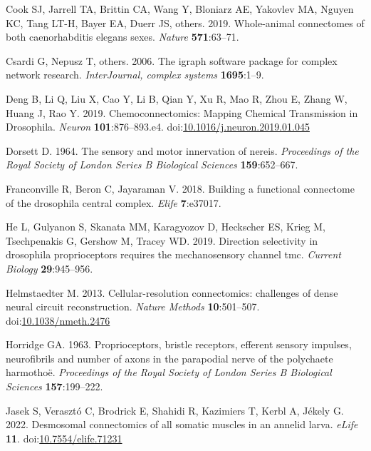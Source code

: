 \documentclass[
  11pt,
]{article}
\newlength{\cslhangindent}
\newenvironment{CSLReferences}[2] %
 {\begin{list}{}{%
  \setlength{\itemindent}{0pt}
  \setlength{\leftmargin}{0pt}
  \setlength{\parsep}{0pt}
  \ifodd #1
   \setlength{\leftmargin}{\cslhangindent}
   \setlength{\itemindent}{-1\cslhangindent}
  \fi
  \setlength{\itemsep}{#2\baselineskip}}}
 {\end{list}}
\begin{document}
\begin{CSLReferences}{1}{0}
Cook SJ, Jarrell TA, Brittin CA, Wang Y, Bloniarz AE, Yakovlev MA,
Nguyen KC, Tang LT-H, Bayer EA, Duerr JS, others. 2019. Whole-animal
connectomes of both caenorhabditis elegans sexes. \emph{Nature}
\textbf{571}:63--71.

Csardi G, Nepusz T, others. 2006. The igraph software package for
complex network research. \emph{InterJournal, complex systems}
\textbf{1695}:1--9.

Deng B, Li Q, Liu X, Cao Y, Li B, Qian Y, Xu R, Mao R, Zhou E, Zhang W,
Huang J, Rao Y. 2019. Chemoconnectomics: Mapping Chemical Transmission
in Drosophila. \emph{Neuron} \textbf{101}:876--893.e4.
doi:\href{https://doi.org/10.1016/j.neuron.2019.01.045}{10.1016/j.neuron.2019.01.045}

Dorsett D. 1964. The sensory and motor innervation of nereis.
\emph{Proceedings of the Royal Society of London Series B Biological
Sciences} \textbf{159}:652--667.

Franconville R, Beron C, Jayaraman V. 2018. Building a functional
connectome of the drosophila central complex. \emph{Elife}
\textbf{7}:e37017.

He L, Gulyanon S, Skanata MM, Karagyozov D, Heckscher ES, Krieg M,
Tsechpenakis G, Gershow M, Tracey WD. 2019. Direction selectivity in
drosophila proprioceptors requires the mechanosensory channel tmc.
\emph{Current Biology} \textbf{29}:945--956.

Helmstaedter M. 2013. Cellular-resolution connectomics: challenges of
dense neural circuit reconstruction. \emph{Nature Methods}
\textbf{10}:501--507.
doi:\href{https://doi.org/10.1038/nmeth.2476}{10.1038/nmeth.2476}

Horridge GA. 1963. Proprioceptors, bristle receptors, efferent sensory
impulses, neurofibrils and number of axons in the parapodial nerve of
the polychaete harmotho{ë}. \emph{Proceedings of the Royal Society of
London Series B Biological Sciences} \textbf{157}:199--222.

Jasek S, Verasztó C, Brodrick E, Shahidi R, Kazimiers T, Kerbl A, Jékely
G. 2022. Desmosomal connectomics of all somatic muscles in an annelid
larva. \emph{eLife} \textbf{11}.
doi:\href{https://doi.org/10.7554/elife.71231}{10.7554/elife.71231}


\end{CSLReferences}
\end{document}
